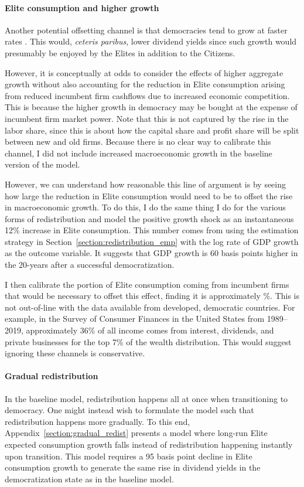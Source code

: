 \documentclass[12pt]{article}
\numberwithin{equation}{section}
\begin{document}
\paragraph{Elite consumption and higher growth}
\label{par:higher_growth_beg}
Another potential offsetting channel is that democracies tend to grow at faster rates \citep{Acemoglu2019}. This would, {\it ceteris paribus}, lower dividend yields since such growth would presumably be enjoyed by the Elites in addition to the Citizens.

However, it is conceptually at odds to consider the effects of higher aggregate growth without also accounting for the reduction in Elite consumption arising from reduced incumbent firm cashflows due to increased economic competition. This is because the higher growth in democracy may be bought at the expense of incumbent firm market power. Note that this is not captured by the rise in the labor share, since this is about how the capital share and profit share will be split between new and old firms. Because there is no clear way to calibrate this channel, I did not include increased macroeconomic growth in the baseline version of the model.

However, we can understand how reasonable this line of argument is by seeing how large the reduction in Elite consumption would need to be to offset the rise in macroeconomic growth. To do this, I do the same thing I do for the various forms of redistribution and model the positive growth shock as an instantaneous 12\% increase in Elite consumption. This number comes from using the estimation strategy in Section~\ref{section:redistribution_emp} with the log rate of GDP growth as the outcome variable. It suggests that GDP growth is 60 basis points higher in the 20-years after a successful democratization.

I then calibrate the portion of Elite consumption coming from incumbent firms that would be necessary to offset this effect, finding it is approximately \modelHigherGrowthAdj\%. This is not out-of-line with the data available from developed, democratic countries. For example, in the Survey of Consumer Finances in the United States from 1989--2019, approximately 36\% of all income comes from interest, dividends, and private businesses for the top 7\% of the wealth distribution. This would suggest ignoring these channels is conservative.
\label{par:higher_growth_end}

\paragraph{Gradual redistribution}
\label{par:gradual_redist}
In the baseline model, redistribution happens all at once when transitioning to democracy. One might instead wish to formulate the model such that redistribution happens more gradually. To this end, Appendix~\ref{section:gradual_redist} presents a model where long-run Elite expected consumption growth falls instead of redistribution happening instantly upon transition. This model requires a 95 basis point decline in Elite consumption growth to generate the same rise in dividend yields in the democratization state as in the baseline model.
\end{document}
